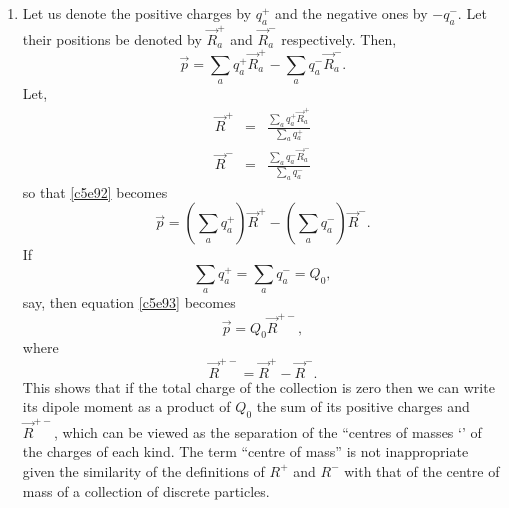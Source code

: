 \begin{enumerate}
\item Let us denote the positive charges by $q_a^+$ and the negative ones by
$-q_a^-$. Let their positions be denoted by $\vec{R}_a^+$ and $\vec{R}_a^-$
respectively. Then,
\begin{equation}\label{c5e92}
\vec{p} =  \sum_a q_a^+\vec{R}_a^+ - \sum_a q_a^-\vec{R}_a^-.
\end{equation}
Let,
\begin{eqnarray*}
\vec{R}^+ &=& \frac{\sum_a q_a^+\vec{R}_a^+}{\sum_a q_a^+} \\
\vec{R}^- &=& \frac{\sum_a q_a^-\vec{R}_a^-}{\sum_a q_a^-}
\end{eqnarray*}
so that \eqref{c5e92} becomes
\begin{equation}\label{c5e93}
\vec{p} = \left(\sum_a q_a^+\right)\vec{R}^+ - 
\left(\sum_a q_a^-\right)\vec{R}^-.
\end{equation}
If
\begin{equation}\label{c5e94}
\sum_a q_a^+ = \sum_a q_a^- = Q_0,
\end{equation}
say, then equation \eqref{c5e93} becomes
\begin{equation}\label{c5e95}
\vec{p} = Q_0\vec{R}^{+-},
\end{equation}
where
\begin{equation}\label{c5e96}
\vec{R}^{+-} = \vec{R}^+ - \vec{R}^-.
\end{equation}
This shows that if the total charge of the collection is zero then we can write 
its dipole moment as a product of $Q_0$ the sum of its positive charges and 
$\vec{R}^{+-}$, which can be viewed as the separation of the ``centres of masses
`' of the charges of each kind. The term ``centre of mass'' is not inappropriate
given the similarity of the definitions of $R^+$ and $R^-$ with that of the 
centre of mass of a collection of discrete particles.


\end{enumerate}
